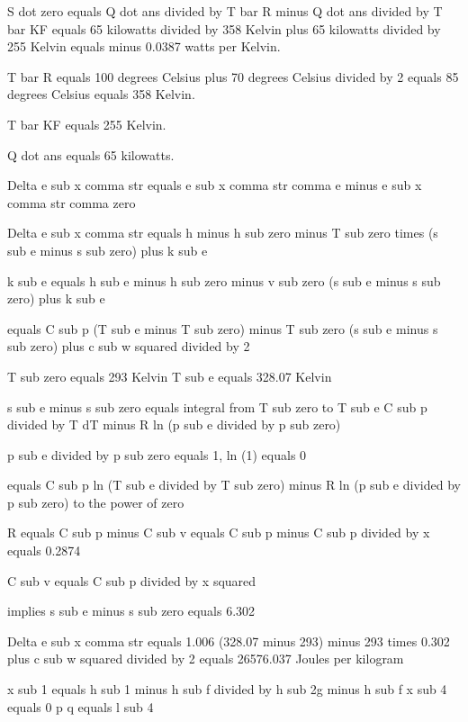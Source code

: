 S dot zero equals Q dot ans divided by T bar R minus Q dot ans divided by T bar KF equals 65 kilowatts divided by 358 Kelvin plus 65 kilowatts divided by 255 Kelvin equals minus 0.0387 watts per Kelvin.

T bar R equals 100 degrees Celsius plus 70 degrees Celsius divided by 2 equals 85 degrees Celsius equals 358 Kelvin.

T bar KF equals 255 Kelvin.

Q dot ans equals 65 kilowatts.

Delta e sub x comma str equals e sub x comma str comma e minus e sub x comma str comma zero

Delta e sub x comma str equals h minus h sub zero minus T sub zero times (s sub e minus s sub zero) plus k sub e

k sub e equals h sub e minus h sub zero minus v sub zero (s sub e minus s sub zero) plus k sub e

equals C sub p (T sub e minus T sub zero) minus T sub zero (s sub e minus s sub zero) plus c sub w squared divided by 2

T sub zero equals 293 Kelvin
T sub e equals 328.07 Kelvin

s sub e minus s sub zero equals integral from T sub zero to T sub e C sub p divided by T dT minus R ln (p sub e divided by p sub zero)

p sub e divided by p sub zero equals 1, ln (1) equals 0

equals C sub p ln (T sub e divided by T sub zero) minus R ln (p sub e divided by p sub zero) to the power of zero

R equals C sub p minus C sub v equals C sub p minus C sub p divided by x equals 0.2874

C sub v equals C sub p divided by x squared

implies s sub e minus s sub zero equals 6.302

Delta e sub x comma str equals 1.006 (328.07 minus 293) minus 293 times 0.302 plus c sub w squared divided by 2 equals 26576.037 Joules per kilogram

x sub 1 equals h sub 1 minus h sub f divided by h sub 2g minus h sub f  
x sub 4 equals 0  
p q equals l sub 4